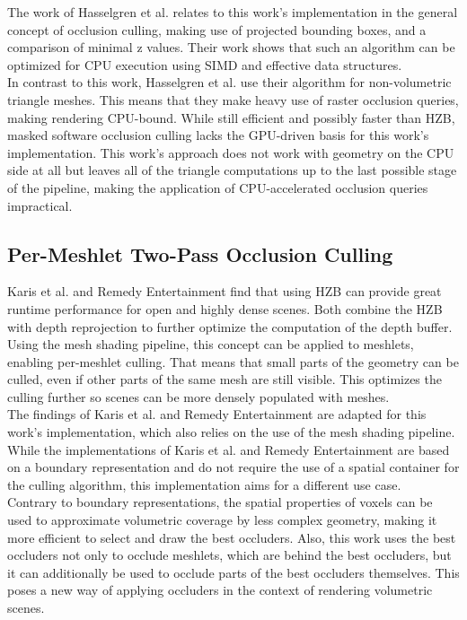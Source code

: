\noindent
The work of Hasselgren et al. relates to this work's implementation in the general concept of occlusion culling, making 
use of projected bounding boxes, and a comparison of minimal z values. Their work shows that such an algorithm can be 
optimized for \ac{CPU} execution using \ac{SIMD} and effective data structures. \\

\noindent 
In contrast to this work, Hasselgren et al. use their algorithm for non-volumetric triangle meshes. This means that 
they make heavy use of raster occlusion queries, making rendering CPU-bound. While still efficient and possibly faster 
than \ac{HZB}, masked software occlusion culling lacks the \ac{GPU}-driven basis for this work's implementation. This 
work's approach does not work with geometry on the \ac{CPU} side at all but leaves all of the triangle computations up 
to the last possible stage of the pipeline, making the application of \ac{CPU}-accelerated occlusion queries impractical.


\subsection*{Per-Meshlet Two-Pass Occlusion Culling}

Karis et al. \cite{Karis2021} and Remedy Entertainment \cite{Remedy2023} find that using \ac{HZB} can provide great 
runtime performance for open and highly dense scenes. Both combine the \ac{HZB} with depth reprojection to further optimize 
the computation of the depth buffer. Using the mesh shading pipeline, this concept can be applied to meshlets, enabling 
per-meshlet culling. That means that small parts of the geometry can be culled, even if other parts of the same mesh are 
still visible. This optimizes the culling further so scenes can be more densely populated with meshes. \\

\noindent
The findings of Karis et al. and Remedy Entertainment are adapted for this work's implementation, which also relies on 
the use of the mesh shading pipeline. While the implementations of Karis et al. and Remedy Entertainment are based on 
a boundary representation and do not require the use of a spatial container for the culling algorithm, this 
implementation aims for a different use case. \\

\noindent
Contrary to boundary representations, the spatial properties of voxels 
can be used to approximate volumetric coverage by less complex geometry, making it more efficient to select and draw the 
best occluders. Also, this work uses the best occluders not only to occlude meshlets, which are behind the best occluders, 
but it can additionally be used to occlude parts of the best occluders themselves. This poses a new way of applying occluders 
in the context of rendering volumetric scenes.
